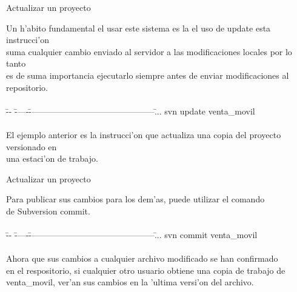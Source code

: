 \documentclass[xcolor=dvipsnames]{beamer}
\begin{document}
	\begin{frame}{Actualizar un proyecto}

	\scriptsize
	{
	\begin{tabbing}
	Un h'abito fundamental el usar este sistema es la el uso de \scriptsize{\color{Blue}update} esta instrucci'on \\
	suma cualquier cambio enviado al servidor a las modificaciones locales por lo tanto \\
	es de suma importancia ejecutarlo siempre antes de enviar modificaciones al repositorio. \\ \\
	
	\= -- \= -----\= ---------------------------------------------\=  ... \kill
	\>\> svn update \scriptsize{\color{Blue}venta\_movil} 								\\ \\
	
	El ejemplo anterior es la instrucci'on que actualiza una copia del proyecto versionado en \\
	una estaci'on de trabajo.\\
	
	\end{tabbing}
	}
	\end{frame}	
	
	\begin{frame}{Actualizar un proyecto}
	\scriptsize
	{
	\begin{tabbing}
	Para publicar sus cambios para los dem'as, puede utilizar el comando \\
	de Subversion \scriptsize{\color{Blue}commit}. \\ \\
	\= -- \= -----\= ---------------------------------------------\=  ... \kill
	\>\> svn commit \scriptsize{\color{Blue}venta\_movil} 								\\ \\
	
	Ahora que sus cambios a cualquier archivo modificado se han confirmado \\
	en el respositorio, si cualquier otro usuario obtiene una copia de trabajo de\\
	\scriptsize{\color{Blue}venta\_movil}, ver'an sus	cambios en la 'ultima versi'on del archivo.\\
	\end{tabbing}
	}
	\end{frame}	
\end{document}
